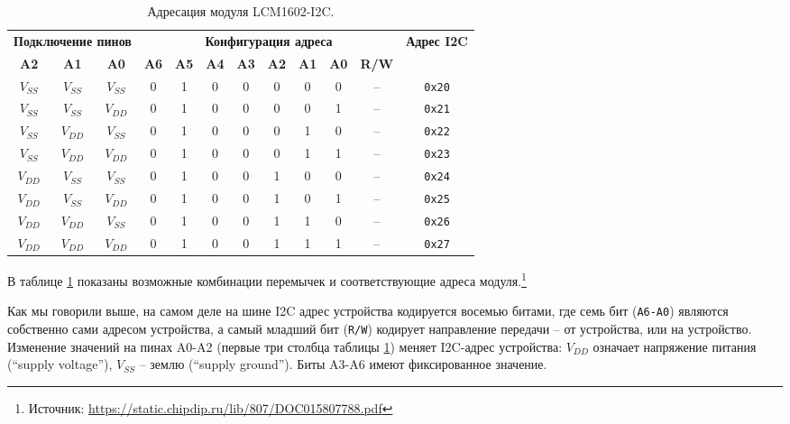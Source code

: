 \documentclass[../sparc.tex]{subfiles}
\begin{document}
\begin{table}[H]
  \centering
  \begin{tabular}{
      | c | c | c
      | c | c | c | c | c | c | c
      | c
      | c
      | }
    \hline
    \multicolumn{3}{|c|}{\textbf{Подключение пинов}}
    & \multicolumn{8}{c|}{\textbf{Конфигурация адреса}}
    & \multirow{2}{2em}{\textbf{Адрес I2C}} \\
    \cline{1-11}
    \textbf{A2}
    & \textbf{A1}
    & \textbf{A0}
    & \textbf{A6}
    & \textbf{A5}
    & \textbf{A4}
    & \textbf{A3}
    & \textbf{A2}
    & \textbf{A1}
    & \textbf{A0}
    & \textbf{R/W}
    &   \\
    \hline
    $V_{SS}$ & $V_{SS}$ & $V_{SS}$ & 0 & 1 & 0 & 0 & 0 & 0 & 0 & -- & \texttt{0x20} \\
    \hline
    $V_{SS}$ & $V_{SS}$ & $V_{DD}$ & 0 & 1 & 0 & 0 & 0 & 0 & 1 & -- & \texttt{0x21} \\
    \hline
    $V_{SS}$ & $V_{DD}$ & $V_{SS}$ & 0 & 1 & 0 & 0 & 0 & 1 & 0 & -- & \texttt{0x22} \\
    \hline
    $V_{SS}$ & $V_{DD}$ & $V_{DD}$ & 0 & 1 & 0 & 0 & 0 & 1 & 1 & -- & \texttt{0x23} \\
    \hline
    $V_{DD}$ & $V_{SS}$ & $V_{SS}$ & 0 & 1 & 0 & 0 & 1 & 0 & 0 & -- & \texttt{0x24} \\
    \hline
    $V_{DD}$ & $V_{SS}$ & $V_{DD}$ & 0 & 1 & 0 & 0 & 1 & 0 & 1 & -- & \texttt{0x25} \\
    \hline
    $V_{DD}$ & $V_{DD}$ & $V_{SS}$ & 0 & 1 & 0 & 0 & 1 & 1 & 0 & -- & \texttt{0x26} \\
    \hline
    $V_{DD}$ & $V_{DD}$ & $V_{DD}$ & 0 & 1 & 0 & 0 & 1 & 1 & 1 & -- & \texttt{0x27} \\
    \hline
  \end{tabular}
  \caption{Адресация модуля LCM1602-I2C.}
  \label{table:i2c-lcm1602-addressing}
\end{table}

В таблице \ref{table:i2c-lcm1602-addressing} показаны возможные комбинации
перемычек и соответствующие адреса модуля.\footnote{Источник:
\url{https://static.chipdip.ru/lib/807/DOC015807788.pdf}}

Как мы говорили выше, на самом деле на шине I2C адрес устройства кодируется
восемью битами, где семь бит (\texttt{A6-A0}) являются собственно сами адресом
устройства, а самый младший бит (\texttt{R/W}) кодирует направление передачи --
от устройства, или на устройство.  Изменение значений на пинах A0-A2 (первые три
столбца таблицы \ref{table:i2c-lcm1602-addressing}) меняет I2C-адрес устройства:
$V_{DD}$ означает напряжение питания (``supply voltage''), $V_{SS}$ -- землю
(``supply ground'').  Биты A3-A6 имеют фиксированное значение.
\end{document}
